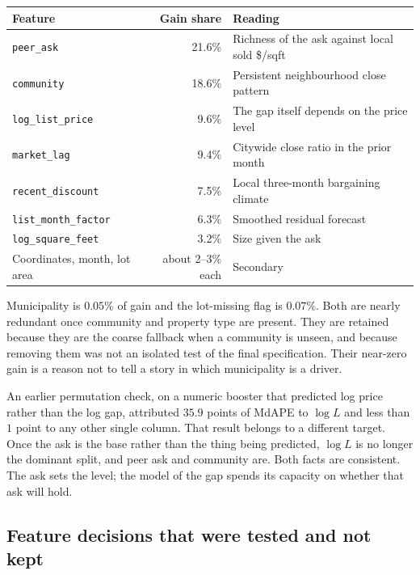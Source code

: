 \documentclass[11pt]{article}
\begin{document}
\begin{center}
\begin{tabular}{lr l}
\toprule
Feature & Gain share & Reading \\
\midrule
\texttt{peer\_ask} & 21.6\% & Richness of the ask against local sold \$/sqft \\
\texttt{community} & 18.6\% & Persistent neighbourhood close pattern \\
\texttt{log\_list\_price} & 9.6\% & The gap itself depends on the price level \\
\texttt{market\_lag} & 9.4\% & Citywide close ratio in the prior month \\
\texttt{recent\_discount} & 7.5\% & Local three-month bargaining climate \\
\texttt{list\_month\_factor} & 6.3\% & Smoothed residual forecast \\
\texttt{log\_square\_feet} & 3.2\% & Size given the ask \\
Coordinates, month, lot area & about 2--3\% each & Secondary \\
\bottomrule
\end{tabular}
\end{center}

Municipality is \(0.05\%\) of gain and the lot-missing flag is \(0.07\%\). Both are nearly redundant once community and property type are present. They are retained because they are the coarse fallback when a community is unseen, and because removing them was not an isolated test of the final specification. Their near-zero gain is a reason not to tell a story in which municipality is a driver.

An earlier permutation check, on a numeric booster that predicted log price rather than the log gap, attributed \(35.9\) points of MdAPE to \(\log L\) and less than \(1\) point to any other single column. That result belongs to a different target. Once the ask is the base rather than the thing being predicted, \(\log L\) is no longer the dominant split, and peer ask and community are. Both facts are consistent. The ask sets the level; the model of the gap spends its capacity on whether that ask will hold.

\subsection{Feature decisions that were tested and not kept}
\end{document}

